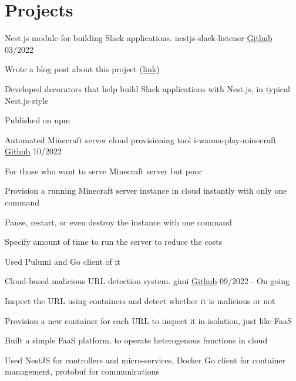 \section{Projects}

\cventry
{Nest.js module for building Slack applications.}
{nestjs-slack-listener}
{\href{https://github.com/hanchchch/nestjs-slack-listener}{Github}}
{03/2022}
\begin{cvitems}
\item {Wrote a blog post about this project \href{https://velog.io/@hanchchch/%EC%A7%84%EC%8B%AC%EC%9C%BC%EB%A1%9C-%EC%97%85%EB%AC%B4-%EC%9E%90%EB%8F%99%ED%99%94-%EC%8A%AC%EB%9E%99%EB%B4%87-%EB%A7%8C%EB%93%A4%EA%B8%B0-1}{(link)}}
\item {Developed decorators that help build Slack applications with Nest.js, in typical Nest.js-style}
\item {Published on npm}
\end{cvitems}

\cventry
{Automated Minecraft server cloud provisioning tool}
{i-wanna-play-minecraft}
{\href{https://github.com/hanchchch/i-wanna-play-minecraft}{Github}}
{10/2022}
\begin{cvitems}
\item {For those who want to serve Minecraft server but poor}
\item {Provision a running Minecraft server instance in cloud instantly with only one command}
\item {Pause, restart, or even destroy the instance with one command}
\item {Specify amount of time to run the server to reduce the costs}
\item {Used Pulumi and Go client of it}
\end{cvitems}

\cventry
{Cloud-based malicious URL detection system.}
{gimi}
{\href{https://github.com/hanchchch/gimi}{Github}}
{09/2022 - On going}
\begin{cvitems}
\item {Inspect the URL using containers and detect whether it is malicious or not}
\item {Provision a new container for each URL to inspect it in isolation, just like FaaS}
\item {Built a simple FaaS platform, to operate heterogenous functions in cloud}
\item {Used NestJS for controllers and micro-services, Docker Go client for container management, protobuf for communications}
\end{cvitems}
